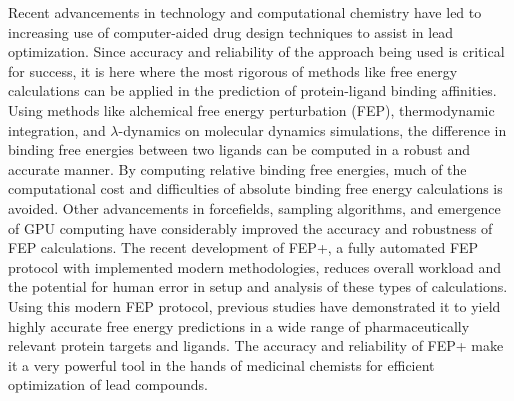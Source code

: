 \documentclass[journal=jctcce,manuscript=article]{achemso}
\begin{document}
Recent advancements in technology and computational chemistry have led to increasing use of computer-aided drug design techniques to assist in lead optimization.
Since accuracy and reliability of the approach being used is critical for success, it is here where the most rigorous of methods like free energy calculations can be applied in the prediction of protein-ligand binding affinities.
Using methods like alchemical free energy perturbation (FEP), thermodynamic integration, and $\lambda$-dynamics on molecular dynamics simulations, the difference in binding free energies between two ligands can be computed in a robust and accurate manner.
By computing relative binding free energies, much of the computational cost and difficulties of absolute binding free energy calculations is avoided\cite{doi:10.1021/ct5000296,chipot2007free,chodera2011alchemical,knight2009lambda,zheng2008random,gallicchio2011advances,doi:10.1021/ct500161f}.
Other advancements in forcefields, sampling algorithms, and emergence of GPU computing have considerably improved the accuracy and robustness of FEP calculations. 
The recent development of FEP+, a fully automated FEP protocol with implemented modern methodologies, reduces overall workload and the potential for human error in setup and analysis of these types of calculations.
Using this modern FEP protocol, previous studies\cite{FEPplus} have demonstrated it to yield highly accurate free energy predictions in a wide range of pharmaceutically relevant protein targets and ligands.
The accuracy and reliability of FEP+ make it a very powerful tool in the hands of medicinal chemists for efficient optimization of lead compounds.
\end{document}
